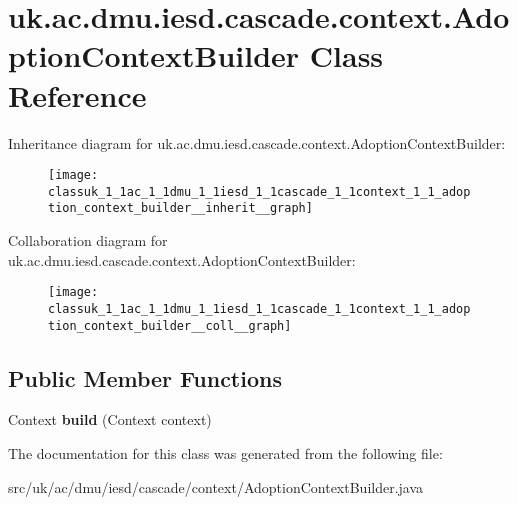 \hypertarget{classuk_1_1ac_1_1dmu_1_1iesd_1_1cascade_1_1context_1_1_adoption_context_builder}{\section{uk.\-ac.\-dmu.\-iesd.\-cascade.\-context.\-Adoption\-Context\-Builder Class Reference}
\label{classuk_1_1ac_1_1dmu_1_1iesd_1_1cascade_1_1context_1_1_adoption_context_builder}
}


Inheritance diagram for uk.\-ac.\-dmu.\-iesd.\-cascade.\-context.\-Adoption\-Context\-Builder\-:\nopagebreak
\begin{figure}[H]
\begin{center}
\leavevmode
\texttt{[image: classuk\_1\_1ac\_1\_1dmu\_1\_1iesd\_1\_1cascade\_1\_1context\_1\_1\_adoption\_context\_builder\_\_inherit\_\_graph]}
\end{center}
\end{figure}


Collaboration diagram for uk.\-ac.\-dmu.\-iesd.\-cascade.\-context.\-Adoption\-Context\-Builder\-:\nopagebreak
\begin{figure}[H]
\begin{center}
\leavevmode
\texttt{[image: classuk\_1\_1ac\_1\_1dmu\_1\_1iesd\_1\_1cascade\_1\_1context\_1\_1\_adoption\_context\_builder\_\_coll\_\_graph]}
\end{center}
\end{figure}
\subsection*{Public Member Functions}
\begin{DoxyCompactItemize}
\item 
\hypertarget{classuk_1_1ac_1_1dmu_1_1iesd_1_1cascade_1_1context_1_1_adoption_context_builder_a453896a51ac6ecfbb077674dfa891ea9}{Context {\bfseries build} (Context context)}\label{classuk_1_1ac_1_1dmu_1_1iesd_1_1cascade_1_1context_1_1_adoption_context_builder_a453896a51ac6ecfbb077674dfa891ea9}

\end{DoxyCompactItemize}


The documentation for this class was generated from the following file\-:\begin{DoxyCompactItemize}
\item 
src/uk/ac/dmu/iesd/cascade/context/Adoption\-Context\-Builder.\-java\end{DoxyCompactItemize}
